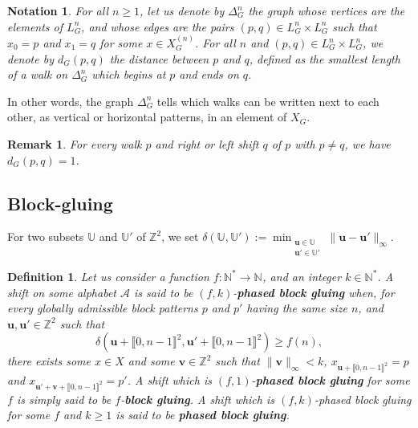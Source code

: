 \documentclass{article}
\newtheorem{definition}[theorem]{Definition}
\newtheorem{notation}[theorem]{Notation}
\newtheorem{remark}[theorem]{Remark}
\begin{document}
\begin{notation}
For all $n \ge 1$, let us denote by $\Delta_G^n$ the graph whose vertices are 
the elements of $L^n_G$, and whose edges are the 
pairs $(p,q) \in L^n_G \times L^n_G$ such that $x_0 = p$ and $x_1 = q$ for some $x\in X^{(n)}_G$. For all $n$ and $(p,q) \in L^n_G \times L^n_G$, we denote by $d_G(p,q)$ the distance between $p$ and $q$, defined as the smallest length of a walk on $\Delta_G^n$ 
which begins at $p$ and ends on $q$. 
\end{notation}

In other words, the graph $\Delta_G^n$ tells which walks can be written next to each other, as vertical or horizontal patterns, in an element of $X_G$. 

\begin{remark}\label{remark.shift.neighbors}
For every walk $p$ and right or left shift $q$ of $p$ with $p\neq q$, we have $d_G(p,q) = 1$.
\end{remark}



\subsection{Block-gluing}

For two subsets $\mathbb{U}$ and $\mathbb{U}'$ of 
$\mathbb{Z}^2$, we set $\delta(\mathbb{U},\mathbb{U}') := \min_{\substack{\textbf{u} \in \mathbb{U}\\ \textbf{u}' \in \mathbb{U}'}} \|\textbf{u}-\textbf{u}'\|_{\infty}$.

\begin{definition}
Let us consider a function $f : \mathbb{N}^{*} \rightarrow \mathbb{N}^{}$, and an integer $k \in \mathbb{N}^{*}$. A shift on some alphabet $\mathcal{A}$ is said to be $(f,k)$-\textbf{phased block gluing} when, for every globally admissible block patterns $p$ and $p'$ having the same size $n$, 
and $\textbf{u},\textbf{u}' \in \mathbb{Z}^2$ such that 
\[\delta\left(\textbf{u} + \llbracket 0,n-1\rrbracket^2, \textbf{u}' + \llbracket 0,n-1\rrbracket^2 \right) \ge f(n),\]
there exists some $x\in X$ and some $\textbf{v} \in \mathbb{Z}^2$
such that $\|\textbf{v}\|_{\infty} < k$, $x_{\textbf{u} + \llbracket 0,n-1\rrbracket^2}=p$ and $x_{\textbf{u}'+\textbf{v} + \llbracket 0,n-1\rrbracket^2}=p'$. A shift which is $(f,1)$-\textbf{phased block gluing} for some $f$ is simply said to be $f$-\textbf{block gluing}. A shift which is $(f,k)$-phased block gluing for some $f$ and $k \ge 1$ is said to be \textbf{phased block gluing}.
\end{definition}
\end{document}
